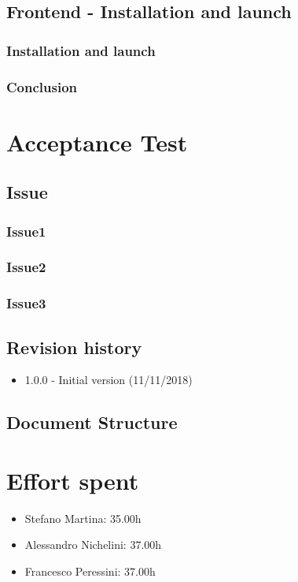 \documentclass{article}
\begin{document}
\newpage	
\subsection{Frontend - Installation and launch}
\subsubsection{Installation and launch}

\subsubsection{Conclusion}
	

\section{Acceptance Test}
\subsection{Issue}
\subsubsection{Issue1}
\subsubsection{Issue2}
\subsubsection{Issue3}


\subsection{Revision history}
\begin{itemize}
	\item 1.0.0 - Initial version (11/11/2018)

\end{itemize}
\subsection{Document Structure}

\newpage










\newpage
\section{Effort spent}

\begin{itemize}
	\item Stefano Martina: 35.00h
	\item Alessandro Nichelini: 37.00h
	\item Francesco Peressini: 37.00h
\end{itemize}
\end{document}

